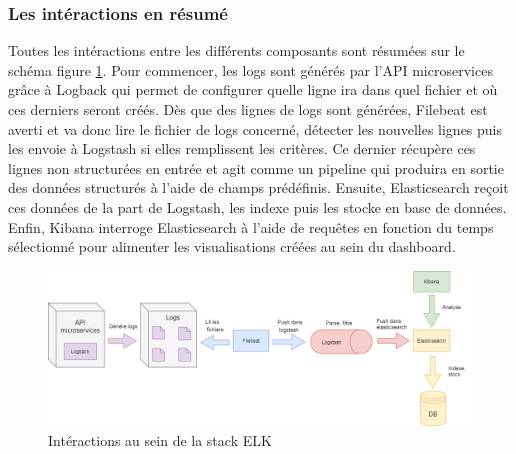 	\subsubsection{Les intéractions en résumé}
	Toutes les intéractions entre les différents composants sont résumées sur le schéma figure \ref{elk}. Pour commencer, les logs sont générés par l'API microservices grâce à Logback qui permet de configurer quelle ligne ira dans quel fichier et où ces derniers seront créés. Dès que des lignes de logs sont générées, Filebeat est averti et va donc lire le fichier de logs concerné, détecter les nouvelles lignes puis les envoie à Logstash si elles remplissent les critères. Ce dernier récupère ces lignes non structurées en entrée et agit comme un pipeline qui produira en sortie des données structurés à l'aide de champs prédéfinis. Ensuite, Elasticsearch reçoit ces données de la part de Logstash, les indexe puis les stocke en base de données. Enfin, Kibana interroge Elasticsearch à l'aide de requêtes en fonction du temps sélectionné pour alimenter les visualisations créées au sein du dashboard. 
	
\begin{figure}[h!]
	\includegraphics[scale=0.5]{images/travailNeuflizeOBC/dashboard/elk.png}
	\centering
	\caption{Intéractions au sein de la stack ELK}
	\label{elk}
\end{figure}
